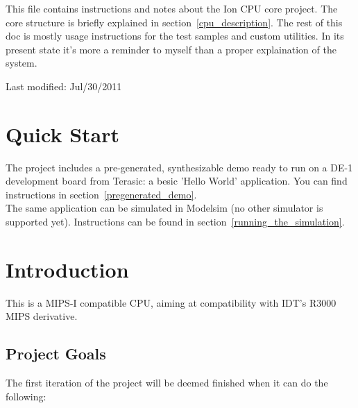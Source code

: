 \documentclass[11pt]{article}
\begin{document}
         


This file contains instructions and notes about the Ion CPU core project.
The core structure is briefly explained in section~\ref{cpu_description}. The rest of this doc is 
mostly usage instructions for the test samples and custom utilities.
In its present state it's more a reminder to myself than a proper explaination 
of the system.

Last modified: Jul/30/2011


\section{Quick Start}
\label{quick_start}

    The project includes a pre-generated, synthesizable demo ready to run on a 
    DE-1 development board from Terasic: a besic 'Hello World' application. 
    You can find instructions in section~\ref{pregenerated_demo}.\\
    
    The same application can be simulated in Modelsim (no other simulator is 
    supported yet). Instructions can be found in section~\ref{running_the_simulation}.


\section{Introduction}
\label{intro}

    This is a MIPS-I compatible CPU, aiming at compatibility with IDT's R3000 
    MIPS derivative.\\

\subsection{Project Goals}
\label{goals}

    The first iteration of the project will be deemed finished when it can do
    the following:
\end{document}
